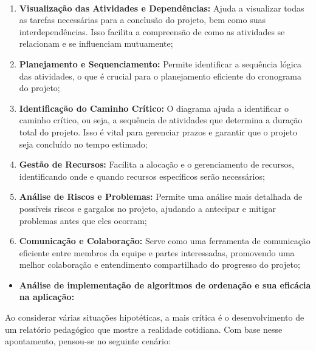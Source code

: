 \\
\begin{enumerate}
\item \textbf{Visualização das Atividades e Dependências:} Ajuda a visualizar todas as tarefas necessárias para a conclusão do projeto, bem como suas interdependências. Isso facilita a compreensão de como as atividades se relacionam e se influenciam mutuamente;  
\\ 
\item \textbf{Planejamento e Sequenciamento: } Permite identificar a sequência lógica das atividades, o que é crucial para o planejamento eficiente do cronograma do projeto;
\\
\item \textbf{Identificação do Caminho Crítico:} O diagrama ajuda a identificar o caminho crítico, ou seja, a sequência de atividades que determina a duração total do projeto. Isso é vital para gerenciar prazos e garantir que o projeto seja concluído no tempo estimado; 
\\
\item \textbf{Gestão de Recursos:} Facilita a alocação e o gerenciamento de recursos, identificando onde e quando recursos específicos serão necessários;  
\\ 
\item \textbf{Análise de Riscos e Problemas:} Permite uma análise mais detalhada de possíveis riscos e gargalos no projeto, ajudando a antecipar e mitigar problemas antes que eles ocorram;
\\
\item \textbf{Comunicação e Colaboração:} Serve como uma ferramenta de comunicação eficiente entre membros da equipe e partes interessadas, promovendo uma melhor colaboração e entendimento compartilhado do progresso do projeto; 
\\
\end{enumerate}

\begin{itemize}

\item \textbf{Análise de implementação de algoritmos de ordenação e sua eficácia na aplicação:}
\\

\end{itemize}

Ao considerar várias situações hipotéticas, a mais crítica é o desenvolvimento de um relatório pedagógico que mostre a realidade cotidiana. Com base nesse apontamento, pensou-se no seguinte cenário:
\\

